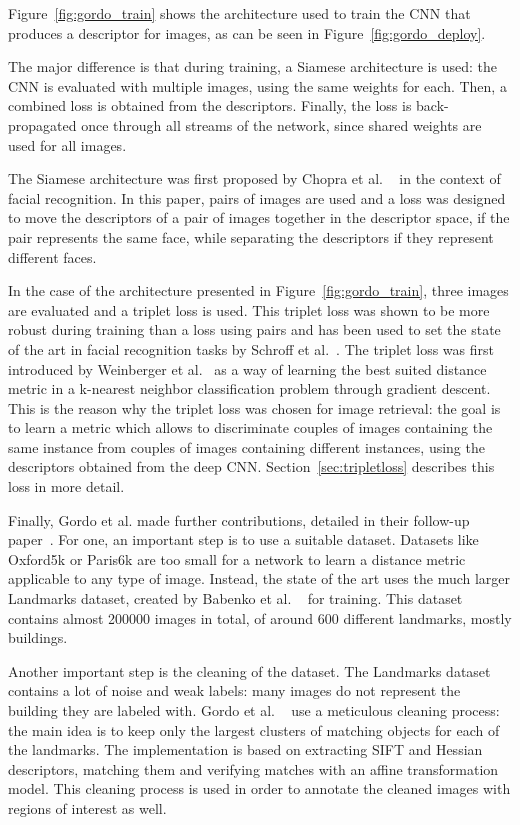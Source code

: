 Figure~\ref{fig:gordo_train} shows the architecture used to train the CNN
that produces a descriptor for images, as can be seen in
Figure~\ref{fig:gordo_deploy}.

The major difference is that during training, a Siamese architecture is
used: the CNN is evaluated with multiple images, using the same weights
for each. Then, a combined loss is obtained from the descriptors.
Finally, the loss is back-propagated once through all streams of the network,
since shared weights are used for all images.

The Siamese architecture was first proposed by Chopra et al.
~\cite{chopra_learning_2005} in the context of facial recognition.
In this paper, pairs of images are used and a loss was designed to
move the descriptors of a pair of images together in the descriptor space,
if the pair represents the same face, while separating the descriptors
if they represent different faces.

In the case of the architecture presented in Figure~\ref{fig:gordo_train},
three images are evaluated and a triplet loss is used.
This triplet loss was shown to be more robust during training than a
loss using pairs and has been used to set the state of the art
in facial recognition tasks by Schroff et al.~\cite{schroff_facenet:_2015}.
The triplet loss was first introduced by
Weinberger et al.~\cite{weinberger_distance_2006} as a way of learning
the best suited distance metric in a k-nearest neighbor classification
problem through gradient descent.
This is the reason why the triplet loss was chosen for image retrieval:
the goal is to learn a metric which allows to discriminate couples of
images containing the same instance from couples of images containing
different instances, using the descriptors obtained from the deep
CNN.
Section~\ref{sec:tripletloss} describes this loss in more detail.

Finally, Gordo et al. made further contributions, detailed in their
follow-up paper~\cite{gordo_end--end_2017}.
For one, an important step is to use a suitable dataset. Datasets like
Oxford5k or Paris6k are too small for a network to learn a distance metric
applicable to any type of image. Instead, the state of the art uses the
much larger Landmarks dataset, created by Babenko et al.
~\cite{babenko_neural_2014} for training.
This dataset contains almost 200000 images in total, of around 600
different landmarks, mostly buildings.

Another important step is the cleaning of the dataset. The Landmarks
dataset contains a lot of noise and weak labels: many images do not
represent the building they are labeled with. Gordo et al.
~\cite{gordo_end--end_2017} use a meticulous
cleaning process: the main idea is to keep only the largest clusters
of matching objects for each of the landmarks. The implementation is
based on extracting SIFT and Hessian descriptors,
matching them and verifying matches with an affine transformation model.
This cleaning process is used in order to annotate the cleaned images
with regions of interest as well.

